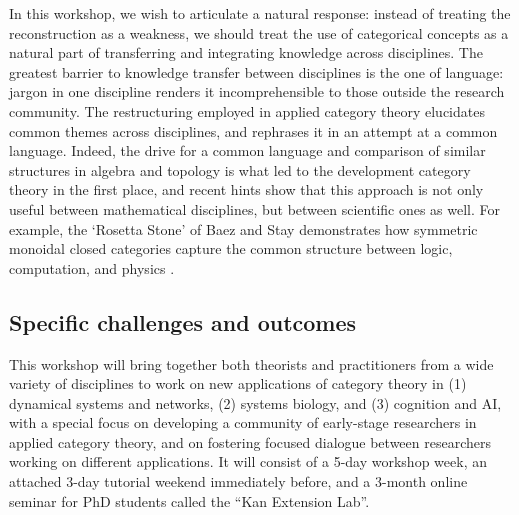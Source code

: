 \documentclass{article}
\newcommand{\redout}[1]{{\color{red}#1}}
\begin{document}
In this workshop, we wish to articulate a natural response: instead of treating the reconstruction as a weakness, we should treat the use of categorical concepts as a natural part of transferring and integrating knowledge across disciplines. The greatest barrier to knowledge transfer between disciplines is the one of language: jargon in one discipline renders it incomprehensible to those outside the research community. The restructuring employed in applied category theory elucidates common themes across disciplines, and rephrases it in an attempt at a common language. Indeed, the drive for a common language and comparison of similar structures in algebra and topology is what led to the development category theory in the first place, and recent hints show that this approach is not only useful between mathematical disciplines, but between scientific ones as well. For example, the `Rosetta Stone' of Baez and Stay demonstrates how symmetric monoidal closed categories capture the common structure between logic, computation, and physics \cite{baez09}. 



\subsection{Specific challenges and outcomes}
This workshop will bring together both theorists and practitioners from a wide variety of disciplines to work on new applications of category theory in (1) dynamical systems and networks, (2) systems biology, and (3) cognition and AI, with a special focus on developing a community of early-stage researchers in applied category theory, and on fostering focused dialogue between researchers working on different applications. It will consist of a 5-day workshop week, an attached 3-day tutorial weekend immediately before, and a 3-month online seminar for PhD students called the ``Kan Extension Lab''.
\end{document}
